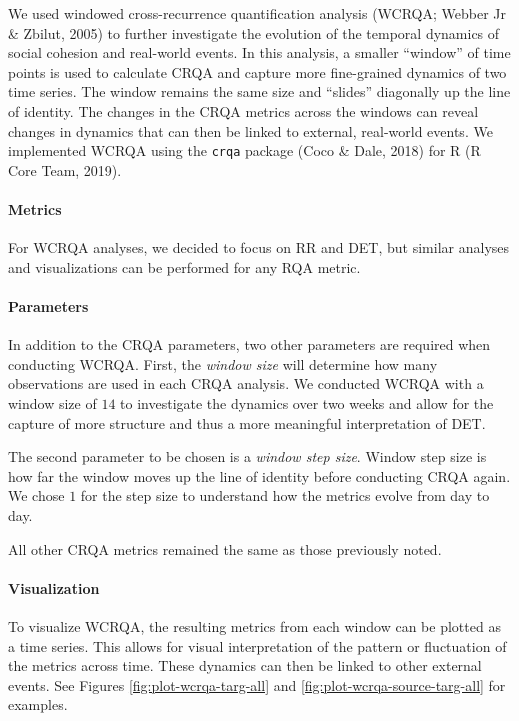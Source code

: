 \documentclass[english,man]{apa6}
\begin{document}
We used windowed cross-recurrence quantification analysis (WCRQA; Webber Jr \& Zbilut, 2005) to further investigate the evolution of the temporal
dynamics of social cohesion and real-world events. In this analysis, a smaller
\enquote{window} of time points is used to calculate CRQA and capture more fine-grained
dynamics of two time series. The window remains the same size and \enquote{slides}
diagonally up the line of identity. The changes in the CRQA metrics across the
windows can reveal changes in dynamics that can then be linked to external,
real-world events. We implemented WCRQA using the \texttt{crqa} package (Coco \& Dale, 2018) for R
(R Core Team, 2019).

\hypertarget{metrics-1}{%
\paragraph{Metrics}\label{metrics-1}}

For WCRQA analyses, we decided to focus on RR and DET, but similar analyses and
visualizations can be performed for any RQA metric.

\hypertarget{parameters-1}{%
\paragraph{Parameters}\label{parameters-1}}

In addition to the CRQA parameters, two other parameters are required when
conducting WCRQA. First, the \emph{window size} will determine how many observations
are used in each CRQA analysis. We conducted WCRQA with a window size of \(14\) to
investigate the dynamics over two weeks and allow for the capture of more
structure and thus a more meaningful interpretation of DET.

The second parameter to be chosen is a \emph{window step size}. Window step size is
how far the window moves up the line of identity before conducting CRQA again.
We chose \(1\) for the step size to understand how the metrics evolve from day to
day.

All other CRQA metrics remained the same as those previously noted.

\hypertarget{visualization-1}{%
\paragraph{Visualization}\label{visualization-1}}

To visualize WCRQA, the resulting metrics from each window can be plotted as a
time series. This allows for visual interpretation of the pattern or fluctuation
of the metrics across time. These dynamics can then be linked to other external
events. See Figures \ref{fig:plot-wcrqa-targ-all} and
\ref{fig:plot-wcrqa-source-targ-all} for examples.
\end{document}
